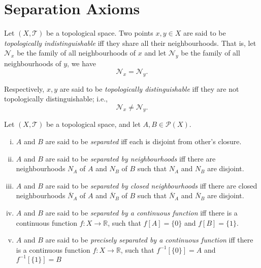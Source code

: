 \section{Separation Axioms}


\begin{definition}
	\label{def: topologically indistinguishable}
	Let $(X, \mathcal T)$ be a topological space. Two points $x,y \in X$ are said to be \textit{topologically indistinguishable} iff they share all their neighbourhoods. That is, let $\mathcal N_x$ be the family of all neighbourhoods of $x$ and let $\mathcal N_y$ be the family of all neighbourhoods of $y$, we have
	$$
	\mathcal N_x = \mathcal N_y.
	$$
	
	Respectively, $x,y$ are said to be \textit{topologically distinguishable} iff they are not topologically distinguishable; i.e.,
	$$
	\mathcal N_x \ne \mathcal N_y.
	$$
\end{definition}


\begin{definition}
	Let $(X, \mathcal T)$ be a topological space, and let $A, B \in \mathcal P(X)$.
	
	\begin{enumerate}[(i)]
		\item $A$ and $B$ are said to be \textit{separated} iff each is disjoint from other's closure.
		\item $A$ and $B$ are said to be \textit{separated by neighbourhoods} iff there are neighbourhoods $N_A$ of $A$ and $N_B$ of $B$ such that $N_A$ and $N_B$ are disjoint.
		\item $A$ and $B$ are said to be \textit{separated by closed neighbourhoods} iff there are closed neighbourhoods $\overline N_A$ of $A$ and $\overline N_B$ of $B$ such that $\overline N_A$ and $\overline N_B$ are disjoint.
		\item $A$ and $B$ are said to be \textit{separated by a continuous function} iff there is a continuous function $f: X \to \mathbb R$, such that $f[A] = \{0\}$ and $f[B] = \{1\}$.
		\item $A$ and $B$ are said to be \textit{precisely separated by a continuous function} iff there is a continuous function $f: X \to \mathbb R$, such that $f^{-1}[\{0\}] = A$ and $f^{-1}[\{1\}] = B$
	\end{enumerate}
\end{definition}


